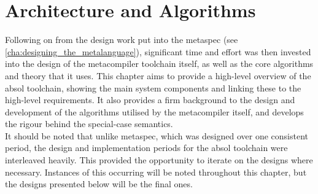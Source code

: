 % 

\chapter{Architecture and Algorithms} %
\label{cha:architecture_and_algorithms}

Following on from the design work put into the \gls{metaspec} (see \autoref{cha:designing_the_metalanguage}), significant time and effort was then invested into the design of the metacompiler toolchain itself, as well as the core algorithms and theory that it uses. 
This chapter aims to provide a high-level overview of the \gls{absol} toolchain, showing the main system components and linking these to the high-level requirements.
It also provides a firm background to the design and development of the algorithms utilised by the metacompiler itself, and develops the rigour behind the special-case semantics. \\

It should be noted that unlike \gls{metaspec}, which was designed over one consistent period, the design and implementation periods for the \gls{absol} toolchain were interleaved heavily.
This provided the opportunity to iterate on the designs where necessary.
Instances of this occurring will be noted throughout this chapter, but the designs presented below will be the final ones. 

